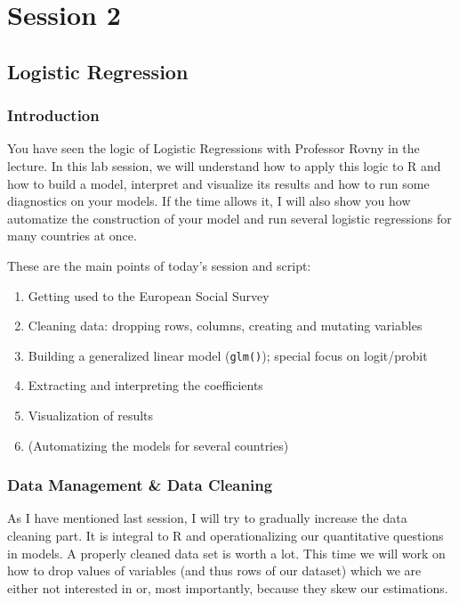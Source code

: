\documentclass[
  letterpaper,
  DIV=11,
  numbers=noendperiod]{scrreprt}
\providecommand{\tightlist}{%
  \setlength{\itemsep}{0pt}\setlength{\parskip}{0pt}}\usepackage{longtable,booktabs,array}
\begin{document}
\part{Session 2}

\hypertarget{logistic-regression}{%
\chapter{Logistic Regression}\label{logistic-regression}}

\hypertarget{introduction-1}{%
\section{Introduction}\label{introduction-1}}

You have seen the logic of Logistic Regressions with Professor Rovny in
the lecture. In this lab session, we will understand how to apply this
logic to R and how to build a model, interpret and visualize its results
and how to run some diagnostics on your models. If the time allows it, I
will also show you how automatize the construction of your model and run
several logistic regressions for many countries at once.

These are the main points of today's session and script:

\begin{enumerate}
\def\labelenumi{\arabic{enumi}.}
\tightlist
\item
  Getting used to the European Social Survey
\item
  Cleaning data: dropping rows, columns, creating and mutating variables
\item
  Building a generalized linear model (\texttt{glm()}); special focus on
  logit/probit
\item
  Extracting and interpreting the coefficients
\item
  Visualization of results
\item
  (Automatizing the models for several countries)
\end{enumerate}

\hypertarget{data-management-data-cleaning}{%
\section{Data Management \& Data
Cleaning}\label{data-management-data-cleaning}}

As I have mentioned last session, I will try to gradually increase the
data cleaning part. It is integral to R and operationalizing our
quantitative questions in models. A properly cleaned data set is worth a
lot. This time we will work on how to drop values of variables (and thus
rows of our dataset) which we are either not interested in or, most
importantly, because they skew our estimations.
\end{document}
